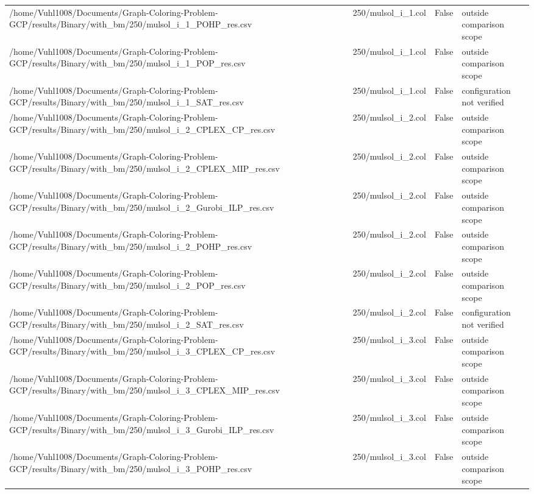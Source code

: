 \begin{table}[htbp]
\begin{tabular}{llll}
/home/Vuhl1008/Documents/Graph-Coloring-Problem-GCP/results/Binary/with\_bm/250/mulsol\_i\_1\_POHP\_res.csv & 250/mulsol\_i\_1.col & False & outside comparison scope \\
/home/Vuhl1008/Documents/Graph-Coloring-Problem-GCP/results/Binary/with\_bm/250/mulsol\_i\_1\_POP\_res.csv & 250/mulsol\_i\_1.col & False & outside comparison scope \\
/home/Vuhl1008/Documents/Graph-Coloring-Problem-GCP/results/Binary/with\_bm/250/mulsol\_i\_1\_SAT\_res.csv & 250/mulsol\_i\_1.col & False & configuration not verified \\
/home/Vuhl1008/Documents/Graph-Coloring-Problem-GCP/results/Binary/with\_bm/250/mulsol\_i\_2\_CPLEX\_CP\_res.csv & 250/mulsol\_i\_2.col & False & outside comparison scope \\
/home/Vuhl1008/Documents/Graph-Coloring-Problem-GCP/results/Binary/with\_bm/250/mulsol\_i\_2\_CPLEX\_MIP\_res.csv & 250/mulsol\_i\_2.col & False & outside comparison scope \\
/home/Vuhl1008/Documents/Graph-Coloring-Problem-GCP/results/Binary/with\_bm/250/mulsol\_i\_2\_Gurobi\_ILP\_res.csv & 250/mulsol\_i\_2.col & False & outside comparison scope \\
/home/Vuhl1008/Documents/Graph-Coloring-Problem-GCP/results/Binary/with\_bm/250/mulsol\_i\_2\_POHP\_res.csv & 250/mulsol\_i\_2.col & False & outside comparison scope \\
/home/Vuhl1008/Documents/Graph-Coloring-Problem-GCP/results/Binary/with\_bm/250/mulsol\_i\_2\_POP\_res.csv & 250/mulsol\_i\_2.col & False & outside comparison scope \\
/home/Vuhl1008/Documents/Graph-Coloring-Problem-GCP/results/Binary/with\_bm/250/mulsol\_i\_2\_SAT\_res.csv & 250/mulsol\_i\_2.col & False & configuration not verified \\
/home/Vuhl1008/Documents/Graph-Coloring-Problem-GCP/results/Binary/with\_bm/250/mulsol\_i\_3\_CPLEX\_CP\_res.csv & 250/mulsol\_i\_3.col & False & outside comparison scope \\
/home/Vuhl1008/Documents/Graph-Coloring-Problem-GCP/results/Binary/with\_bm/250/mulsol\_i\_3\_CPLEX\_MIP\_res.csv & 250/mulsol\_i\_3.col & False & outside comparison scope \\
/home/Vuhl1008/Documents/Graph-Coloring-Problem-GCP/results/Binary/with\_bm/250/mulsol\_i\_3\_Gurobi\_ILP\_res.csv & 250/mulsol\_i\_3.col & False & outside comparison scope \\
/home/Vuhl1008/Documents/Graph-Coloring-Problem-GCP/results/Binary/with\_bm/250/mulsol\_i\_3\_POHP\_res.csv & 250/mulsol\_i\_3.col & False & outside comparison scope \\

\end{tabular}
\end{table}
